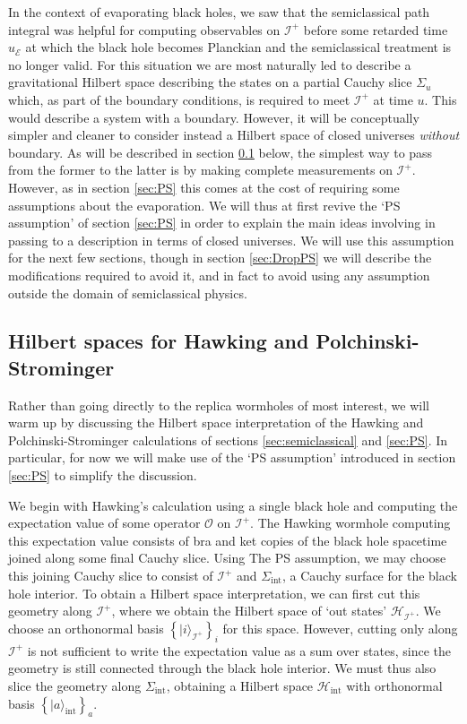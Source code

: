 \documentclass[letterpaper,12pt]{article}
\newcommand*{\hilb}{\mathcal{H}}	%
\newcommand*{\scri}{\mathscr{I}} %
\newcommand*{\evap}{\mathscr{E}} %
\begin{document}
In the context of evaporating black holes, we saw that the semiclassical path integral was helpful for computing observables on $\scri^+$ before some retarded time $u_\evap$ at which the black hole becomes Planckian and the semiclassical treatment is no longer valid. For this situation we are most naturally led to describe a gravitational Hilbert space describing the states on a partial Cauchy slice $\Sigma_u$ which, as part of the boundary conditions, is required to meet $\scri^+$ at time $u$. This would describe a system with a boundary.  However,  it will be conceptually simpler and cleaner to consider instead a Hilbert space of closed universes {\it without} boundary. As will be described in section \ref{sec:HSHPS} below, the simplest way to pass from the former to the latter is by making complete measurements on $\scri^+$.  However, as in section \ref{sec:PS} this comes at the cost of requiring some assumptions about the evaporation.  We will thus at first revive the `PS assumption' of  section \ref{sec:PS} in order to explain the main ideas involving in passing to a description in terms of closed universes.  We will use this assumption for the next few sections, though in section \ref{sec:DropPS} we will describe the modifications required to avoid it, and in fact to avoid using any assumption outside the domain of semiclassical physics.

\subsection{Hilbert spaces for Hawking and Polchinski-Strominger}
\label{sec:HSHPS}

Rather than going directly to the replica wormholes of most interest, we will warm up by discussing the Hilbert space interpretation of the Hawking and Polchinski-Strominger calculations of sections \ref{sec:semiclassical} and \ref{sec:PS}. In particular, for now we will make use of the `PS assumption' introduced in section \ref{sec:PS} to simplify the discussion.

We begin with Hawking's calculation using a single black hole and computing the expectation value of some operator $\mathcal{O}$ on $\scri^+$. The Hawking wormhole computing this expectation value consists of bra and ket copies of the black hole spacetime joined along some final Cauchy slice. Using The PS assumption, we may choose this joining Cauchy slice to consist of $\scri^+$ and $\Sigma_\mathrm{int}$, a Cauchy surface for the black hole interior. To obtain a Hilbert space interpretation, we can first cut this geometry along $\scri^+$, where we obtain the Hilbert space of `out states' $\hilb_{\scri^+}$. We choose an orthonormal basis $\left\{|i\rangle_{\scri^+}\right\}_i$ for this space. However, cutting only along $\scri^+$ is not sufficient to write the expectation value as a sum over states, since the geometry is still connected through the black hole interior. We must thus also slice the geometry along $\Sigma_\mathrm{int}$, obtaining a Hilbert space  $\hilb_\mathrm{int}$ with orthonormal basis $\left\{|a \rangle_\mathrm{int}\right\}_a$.
\end{document}
